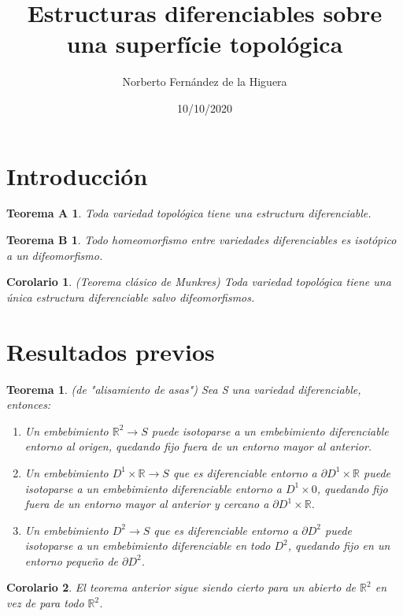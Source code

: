 \documentclass[11pt]{article}
\title{\textbf{Estructuras diferenciables sobre una superfície topológica}}
\author{Norberto Fernández de la Higuera}
\date{10/10/2020}
\newtheorem{teor}{Teorema}
\newtheorem{cor}{Corolario}
\newtheorem*{teora}{Teorema A}
\newtheorem*{teorb}{Teorema B}
\begin{document}
\maketitle

\section{Introducción}

	\begin{teora}
		Toda variedad topológica tiene una estructura diferenciable.
	\end{teora}

	\begin{teorb}
		Todo homeomorfismo entre variedades diferenciables es isotópico a un difeomorfismo.
	\end{teorb}

	\begin{cor} (Teorema clásico de Munkres)
		Toda variedad topológica tiene una única estructura diferenciable salvo difeomorfismos.
	\end{cor}

\section{Resultados previos}

	\begin{teor} (de "alisamiento de asas")
		Sea S una variedad diferenciable, entonces:
		\begin{enumerate}
			\item Un embebimiento $\mathbb{R}^2 \rightarrow S$ puede isotoparse a un embebimiento diferenciable entorno al origen, quedando fijo fuera de un entorno mayor al anterior.
			\item Un embebimiento $D^1\times\mathbb{R} \rightarrow S$ que es diferenciable entorno a $\partial D^1\times\mathbb{R}$ puede isotoparse a un embebimiento diferenciable entorno a $D^1\times 0$, quedando fijo fuera de un entorno mayor al anterior y cercano a $\partial D^1\times\mathbb{R}$.
			\item Un embebimiento $D^2 \rightarrow S$ que es diferenciable entorno a $\partial D^2$ puede isotoparse a un embebimiento diferenciable en todo $D^2$, quedando fijo en un entorno pequeño de $\partial D^2$.
		\end{enumerate}
	\end{teor}
	
	\begin{cor}
		El teorema anterior sigue siendo cierto para un abierto de $\mathbb{R}^2$ en vez de para todo $\mathbb{R}^2$.
	\end{cor}
\end{document}
